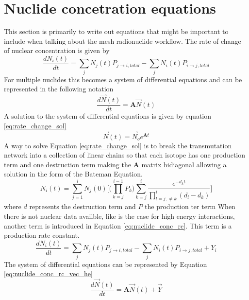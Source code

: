 \section{Nuclide concetration equations}
This section is primarily to write out equations that might be
important to include when talking about the mesh radionuclide
workflow. 
The rate of change of nuclear concentration is given by
\begin{equation}\label{eq:nuclide_conc_rc}
    \frac{dN_{i}(t)}{dt} = \sum_{j} N_{j}(t)P_{j \rightarrow i, total}
    - \sum_{j} N_{i}(t)P_{i \rightarrow j, total}
\end{equation}
For multiple nuclides this becomes a system of differential equations and
can be represented in the following notation
\begin{equation}\label{eq:nuclide_conc_rc_vec}
  \frac{d\vec{N}(t)}{dt} =\boldsymbol{A}  \vec{N}(t)
\end{equation}
A solution to the system of differential equations is given by equation \ref{eq:rate_change_sol}
\begin{equation}\label{eq:rate_change_sol}
  \vec{N}(t) =\vec{N}_{o} e^{\boldsymbol{A}t}
\end{equation}
A way to solve Equation \ref{eq:rate_change_sol} is to break the transmutation network
into a collection of linear chains so that each isotope has one production term and
one destruction term making the $\boldsymbol{A}$ matrix bidiagonal allowing a solution
in the form of the Bateman Equation.
\begin{equation}\label{eq:bateman}
  N_{i}(t) = \sum_{j=1}^{i} N_{j}(0)
  \Bigg[ \Bigg( \prod_{k=j}^{i-1} P_{k} \Bigg)
  \sum_{k=j}^{i}\frac{e^{-d_{k}t}}{\displaystyle \prod_{l=j,\neq k}^{i}(d_{l} -d_{k})}
  \Bigg]
\end{equation}
where $d$ represents the destruction term and $P$ the production ter term
When there is not nuclear data availble, like is the case for high energy interactions,
another term is introduced in Equation \ref{eq:nuclide_conc_rc}. This term is a
production rate constant.
\begin{equation}\label{eq:nuclide_conc_rc_he}
    \frac{dN_{i}(t)}{dt} = \sum_{j} N_{j}(t)P_{j \rightarrow i, total}
    - \sum_{j} N_{i}(t)P_{i \rightarrow j, total} + Y_{i}
\end{equation}
The system of differential equations can be represented by
Equation \ref{eq:nuclide_conc_rc_vec_he}
\begin{equation}\label{eq:nuclide_conc_rc_vec_he}
  \frac{d\vec{N}(t)}{dt} =\boldsymbol{A}  \vec{N}(t) + \vec{Y}
\end{equation}
